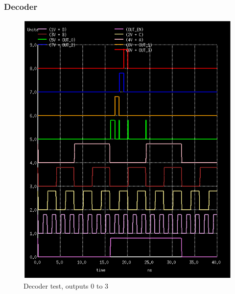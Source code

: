 \documentclass[12pt]{report}
\begin{document}
\subsubsection*{Decoder}
\begin{figure}[H]
  \centering
    \includegraphics[width=1.0\textwidth]{decoder_test_0_to_3.PNG}
  \caption{Decoder test, outputs 0 to 3}
  \label{fig:decoder_test_0_to_3}
\end{figure}
\end{document}
